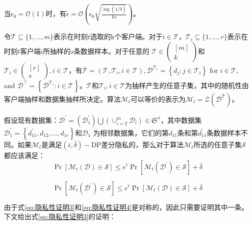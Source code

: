 当$\epsilon_{0}=\mathcal{O}(1)$时，有$\tilde{\epsilon}=\mathcal{O}\left(\epsilon_{0} \sqrt{\frac{\log (1 / \tilde{\delta})}{k s}}\right)$。

令$\mathcal{T} \subseteq\{1, \ldots, m\}$表示在时刻$t$选取的k个客户端。对于$i \in \mathcal{T}$，$\mathcal{T}_{i} \subseteq\{1, \ldots, r\}$表示在时刻$t$客户端$i$所抽样的$s$条数据样本。对于任意的 $\mathcal{T} \in\left(\begin{array}{c}{[m]} \\ k\end{array}\right)$和$\mathcal{T}_{i} \in\left(\begin{array}{c}{[r]} \\ s\end{array}\right), i \in \mathcal{T}$，有$\overline{\mathcal{T}}=\left(\mathcal{T}, \mathcal{T}_{i}, i \in \mathcal{T}\right), \mathcal{D}^{\mathcal{T}_{i}}=\left\{d_{j}: j \in \mathcal{T}_{i}\right\}$ for $i \in \mathcal{T}$, and $\mathcal{D}^{\bar{\top}}=\left\{\mathcal{D}^{\mathcal{T}_{i}}: i \in \mathcal{T}\right\}$。$\mathcal{T}$和$\mathcal{T}_{i}, i \in \mathcal{T}$为抽样产生的任意子集，其中的随机性由客户端抽样和数据集抽样所决定。算法$\mathcal{M}_{t}$可以等价的表示为$\mathcal{M}_{t}=\mathcal{Z}\left(\mathcal{D}^{\overline{\mathcal{T}}}\right)$。

假设现有数据集：$\mathcal{D}^{\prime}=\left(\mathcal{D}_{1}^{\prime}\right) \bigcup\left(\cup_{i=2}^{m} \mathcal{D}_{i}\right) \in \mathfrak{S}^{n}$，其中数据集$\mathcal{D}_{1}^{\prime}=\left\{d_{11}^{\prime}, d_{12}, \ldots, d_{1 r}\right\}$和$\mathcal{D}_{1}$ 为相邻数据集，它们的第$d_{11}$条和第$d_{11}^{\prime}$条数据样本不同。如果$\mathcal{M}_{t}$是满足$(\bar{\epsilon}, \bar{\delta})-\mathrm{DP}$差分隐私的，那么对于算法$\mathcal{M}_{t}$所选的任意子集$\mathcal{S}$ 都应该满足：
\begin{equation}\label{eq:隐私性证明3}
\operatorname{Pr}\left[\mathcal{M}_{t}(\mathcal{D}) \in \mathcal{S}\right] \leq e^{\bar{\epsilon}} \operatorname{Pr}\left[\mathcal{M}_{t}\left(\mathcal{D}^{\prime}\right) \in \mathcal{S}\right]+\bar{\delta}
\end{equation}

\begin{equation}\label{eq:隐私性证明4}
\operatorname{Pr}\left[\mathcal{M}_{t}\left(\mathcal{D}^{\prime}\right) \in \mathcal{S}\right] \leq e^{\bar{\epsilon}} \operatorname{Pr}\left[\mathcal{M}_{t}(\mathcal{D}) \in \mathcal{S}\right]+\bar{\delta}
\end{equation}

由于式\ref{eq:隐私性证明3}和\ref{eq:隐私性证明4}是对称的，因此只需要证明其中一条。下文给出式\ref{eq:隐私性证明3}的证明：

